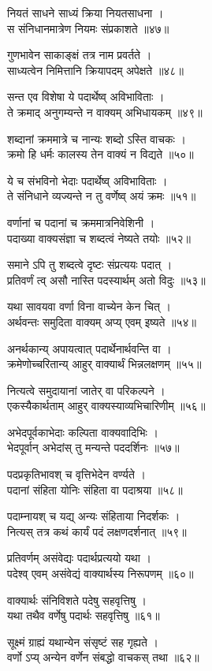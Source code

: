 नियतं साधने साध्यं क्रिया नियतसाधना ।\\स संनिधानमात्रेण नियमः संप्रकाशते ॥४७॥

गुणभावेन साकाङ्क्षं तत्र नाम प्रवर्तते ।\\साध्यत्वेन निमित्तानि क्रियापदम् अपेक्षते ॥४८॥

सन्त एव विशेषा ये पदार्थेष्व् अविभाविताः ।\\ते क्रमाद् अनुगम्यन्ते न वाक्यम् अभिधायकम् ॥४९॥

शब्दानां क्रममात्रे च नान्यः शब्दो ऽस्ति वाचकः ।\\क्रमो हि धर्मः कालस्य तेन वाक्यं न विद्यते ॥५०॥

ये च संभविनो भेदाः पदार्थेष्व् अविभाविताः ।\\ते संनिधाने व्यज्यन्ते न तु वर्णेष्व् अयं क्रमः ॥५१॥

वर्णानां च पदानां च क्रममात्रनिवेशिनी ।\\पदाख्या वाक्यसंज्ञा च शब्दत्वं नेष्यते तयोः ॥५२॥

समाने ऽपि तु शब्दत्वे दृष्टः संप्रत्ययः पदात् ।\\प्रतिवर्णं त्व् असौ नास्ति पदस्यार्थम् अतो विदुः ॥५३॥

यथा सावयवा वर्णा विना वाच्येन केन चित् ।\\अर्थवन्तः समुदिता वाक्यम् अप्य् एवम् इष्यते ॥५४॥

अनर्थकान्य् अपायत्वात् पदार्थेनार्थवन्ति वा ।\\क्रमेणोच्चरितान्य् आहुर् वाक्यार्थं भिन्नलक्षणम् ॥५५॥

नित्यत्वे समुदायानां जातेर् वा परिकल्पने ।\\एकस्यैकार्थताम् आहुर् वाक्यस्याव्यभिचारिणीम् ॥५६॥

अभेदपूर्वकाभेदाः कल्पिता वाक्यवादिभिः ।\\भेदपूर्वान् अभेदांस् तु मन्यन्ते पददर्शिनः ॥५७॥

पदप्रकृतिभावश् च वृत्तिभेदेन वर्ण्यते ।\\पदानां संहिता योनिः संहिता वा पदाश्रया ॥५८॥

पदाम्नायश् च यद्य् अन्यः संहिताया निदर्शकः ।\\नित्यस् तत्र कथं कार्यं पदं लक्षणदर्शनात् ॥५९॥

प्रतिवर्णम् असंवेद्यः पदार्थप्रत्ययो यथा ।\\पदेश्व् एवम् असंवेद्यं वाक्यार्थस्य निरूपणम् ॥६०॥

वाक्यार्थः संनिविशते पदेषु सहवृत्तिषु ।\\यथा तथैव वर्णेषु पदार्थः सहवृत्तिषु ॥६१॥

सूक्ष्मं ग्राह्यं यथान्येन संसृष्टं सह गृह्यते ।\\वर्णो ऽप्य् अन्येन वर्णेन संबद्धो वाचकस् तथा ॥६२॥

